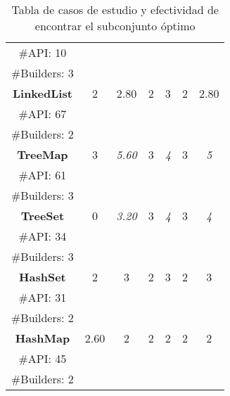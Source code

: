 \begin{table}[H]
\begin{tabular}{c ccccccc}
\multicolumn{2}{c}{\tiny \#API: 10} &  &   & &   & & \\
\multicolumn{2}{c}{\tiny \#Builders: 3} &  &   & &   & & \\
\midrule\multicolumn{2}{c}{\textbf{LinkedList}} & 2 &  2.80 &  2 &  3 &2  &  2.80  \\
\multicolumn{2}{c}{\tiny \#API: 67} &  &   & &   & & \\
\multicolumn{2}{c}{\tiny \#Builders: 2} &  &   & &   & & \\
\midrule
\multicolumn{2}{c}{\textbf{TreeMap}} &  3 & \cellcolor{gray!25}\emph{5.60}  &  3 &  \cellcolor{gray!25} \emph{4}  &3 & \cellcolor{gray!25}\emph{5}   \\
\multicolumn{2}{c}{\tiny \#API: 61} &  &   & &   & & \\
\multicolumn{2}{c}{\tiny \#Builders: 3} &  &   & &   & & \\
\midrule
\multicolumn{2}{c}{\textbf{TreeSet}} &  0&\cellcolor{gray!25} \emph{3.20}  &  3 &   \cellcolor{gray!25}\emph{4}  & 3 & \cellcolor{gray!25}\emph{4}   \\
\multicolumn{2}{c}{\tiny \#API: 34} &  &   & &   & & \\
\multicolumn{2}{c}{\tiny \#Builders: 3} &  &   & &   & & \\
\midrule
\multicolumn{2}{c}{\textbf{HashSet}} &  2 &3  &  2 &  3& 2  &  3 \\
\multicolumn{2}{c}{\tiny \#API: 31} &  &   & &   & & \\
\multicolumn{2}{c}{\tiny \#Builders: 2} &  &   & &   & & \\
\midrule
\multicolumn{2}{c}{\textbf{HashMap}} & 2.60  & 2  &2   &2   &  2 & 2   \\
\multicolumn{2}{c}{\tiny \#API: 45} &  &   & &   & & \\
\multicolumn{2}{c}{\tiny \#Builders: 2} &  &   & &   & & \\
\hline
\end{tabular}

\caption{Tabla de casos de estudio y efectividad de encontrar el subconjunto óptimo}
\label{tab:efectividad}
\end{table}

